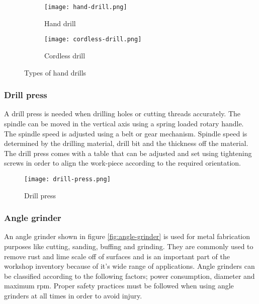 \documentclass[a4paper,12pt]{article}
\begin{document}
					\begin{figure}[H]
						\begin{subfigure}{0.5\linewidth}							
							\centering				
							\texttt{[image: hand-drill.png]}
							\caption{Hand drill}
							\label{subfig:hand-drill}
						\end{subfigure}
						\hfill
						\begin{subfigure}{0.5\linewidth}
							\centering				
							\texttt{[image: cordless-drill.png]}
							\caption{Cordless drill}
							\label{subfig:cordless-drill}
						\end{subfigure}
						\caption{Types of hand drills}
						\label{fig:types-of-drills}
					\end{figure}
						
				\subsubsection*{Drill press}
				
				A drill press is needed when drilling holes or cutting threads accurately. The spindle can be moved in the vertical axis using a spring loaded rotary handle.
				The spindle speed is adjusted using a belt or gear mechanism.
				Spindle speed is determined by the drilling material, drill bit and the thickness off the material.
				The drill press comes with a table that can be adjusted and set using tightening screws in order to align the work-piece according  to the required orientation.  
						\begin{figure}[H]
							\centering				
							\texttt{[image: drill-press.png]}
							\caption{Drill press}
							\label{fig:drill-press}
						\end{figure}
				
				\newpage		
				\subsubsection*{Angle grinder}
						
						An angle grinder shown in figure \ref{fig:angle-grinder} is used for metal fabrication purposes like cutting, sanding, buffing and grinding.
			            They are commonly used to remove rust and lime scale off of surfaces and is an important part of the workshop inventory because of it's wide range of applications.
			            Angle grinders can be classified according to the following factors; power consumption, diameter and maximum rpm.
			            Proper safety practices must be followed when using angle grinders at all times in order to avoid injury.
			            
\end{document}
